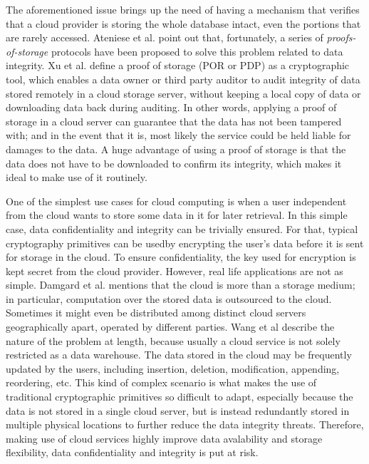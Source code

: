 The aforementioned issue brings up the need of having a mechanism that verifies that a cloud provider is storing the whole database intact, even the portions that are rarely accessed. Ateniese et al. \cite{cryptoeprint:2014:886} point out that, fortunately, a series of \textit{proofs-of-storage} protocols have been proposed to solve this problem related to data integrity. Xu et al. \cite{cryptoeprint:2014:395} define a proof of storage (POR or PDP) as a cryptographic tool, which enables a data owner or third party auditor to audit integrity of data stored remotely in a cloud storage server, without keeping a local copy of data or downloading data back during auditing. In other words, applying a proof of storage in a cloud server can guarantee that the data has not been tampered with; and in the event that it is, most likely the service could be held liable for damages to the data. A huge advantage of using a proof of storage is that the data does not have to be downloaded to confirm its integrity, which makes it ideal to make use of it routinely. 

One of the simplest use cases for cloud computing is when a user independent from the cloud wants to store some data in it for later retrieval. In this simple case, data confidentiality and integrity can be trivially ensured. For that, typical cryptography primitives can be usedby encrypting the user's data before it is sent for storage in the cloud. To ensure confidentiality, the key used for encryption is kept secret from the cloud provider. However, real life applications are not as simple. Damgard et al. \cite{cryptoeprint:2013:629} mentions that the cloud is more than a storage medium; in particular, computation over the stored data is outsourced to the cloud. Sometimes it might even be distributed among distinct cloud servers geographically apart, operated by different parties. Wang et al \cite{cryptoeprint:2009:081} describe the nature of the problem at length, because usually a cloud service is not solely restricted as a data warehouse. The data stored in the cloud may be frequently updated by the users, including insertion, deletion, modification, appending, reordering, etc. This kind of complex scenario is what makes the use of traditional cryptographic primitives so difficult to adapt, especially because the data is not stored in a single cloud server, but is instead redundantly stored in multiple physical locations to further reduce the data integrity threats. Therefore, making use of cloud services highly improve data avalability and storage flexibility, data confidentiality and integrity is put at risk.

